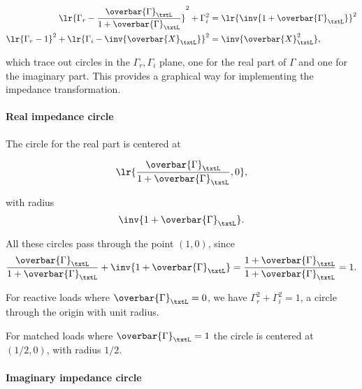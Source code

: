 \begin{equation}\label{eqn:uwavesDeck5SmithChartCore:440}
\begin{aligned}
\lr{ \Gamma_r - \frac{\overbar{\Gamma}_\txtL}{1 + \overbar{\Gamma}_\txtL } }^2 + \Gamma_i^2 &= \lr{ \inv{1 + \overbar{\Gamma}_\txtL }}^2 \\
\lr{ \Gamma_r - 1 }^2 + \lr{ \Gamma_i - \inv{\overbar{X}_\txtL } }^2 &= \inv{\overbar{X}_\txtL^2},
\end{aligned}
\end{equation}

which trace out circles in the \( \Gamma_r, \Gamma_i \) plane, one for the real part of \( \Gamma \) and one for the imaginary part.  This provides a graphical way for implementing the impedance transformation.  

\paragraph{Real impedance circle}

The circle for the real part is centered at 

\begin{dmath}\label{eqn:uwavesDeck5SmithChartCore:580}
\lr{ \frac{\overbar{\Gamma}_\txtL}{1 + \overbar{\Gamma}_\txtL }, 0 },
\end{dmath}

with radius
\begin{dmath}\label{eqn:uwavesDeck5SmithChartCore:600}
\inv{1 + \overbar{\Gamma}_\txtL }.
\end{dmath}

All these circles pass through the point \( (1,0) \), since
\begin{dmath}\label{eqn:uwavesDeck5SmithChartCore:620}
\frac{\overbar{\Gamma}_\txtL}{1 + \overbar{\Gamma}_\txtL } + \inv{1 + \overbar{\Gamma}_\txtL }
=
\frac{1 + \overbar{\Gamma}_\txtL}{1 + \overbar{\Gamma}_\txtL }
= 1.
\end{dmath}

For reactive loads where \( \overbar{\Gamma}_\txtL = 0 \), we have \( \Gamma_r^2 + \Gamma_i^2 = 1 \), a circle through the origin with unit radius.

For matched loads where \( \overbar{\Gamma}_\txtL = 1 \) the circle is centered at \( (1/2, 0) \), with radius \( 1/2 \).

\paragraph{Imaginary impedance circle}

